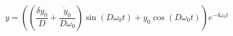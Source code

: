 \begin{equation} \label{eq:analytical_solution_general}
y = \left(\left(\frac{\delta y_{0}}{D} + \frac{\dot{y}_{0}}{D \omega_{0}}\right) \operatorname{sin}\left(D \omega_{0} t\right) + y_{0} \operatorname{cos}\left(D \omega_{0} t\right)\right) e^{- \delta \omega_{0} t}
\end{equation}
